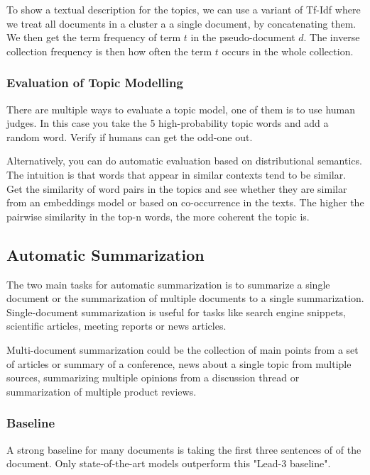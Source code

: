 To show a textual description for the topics, we can use a variant of
Tf-Idf where
we treat all documents in a cluster a a single document, by
concatenating them. We then
get the term frequency of term $t$ in the pseudo-document $d$. The
inverse collection frequency
is then how often the term $t$ occurs in the whole collection.

\subsubsection{Evaluation of Topic Modelling}

There are multiple ways to evaluate a topic model, one of them is to use
human judges. In this case you take the 5 high-probability topic words
and add a random word. Verify if humans can get the odd-one out.

Alternatively, you can do automatic evaluation based on distributional
semantics. The intuition is that words that appear in similar contexts
tend to be similar. Get the similarity of word pairs in the topics and
see whether they are similar from an embeddings model or based on
co-occurrence in the texts. The higher the pairwise similarity in the
top-n words, the more coherent the topic is.

\subsection{Automatic Summarization}

The two main tasks for automatic summarization is to summarize a single
document or the summarization of multiple documents to a single summarization.
Single-document summarization is useful for tasks like search engine snippets,
scientific articles, meeting reports or news articles.

Multi-document summarization could be the collection of main points from
a set of articles or summary of a conference, news about a single topic from
multiple sources, summarizing multiple opinions from a discussion
thread or summarization
of multiple product reviews.

\subsubsection{Baseline}

A strong baseline for many documents is taking the first three sentences of
of the document. Only state-of-the-art models outperform this "Lead-3 baseline".

